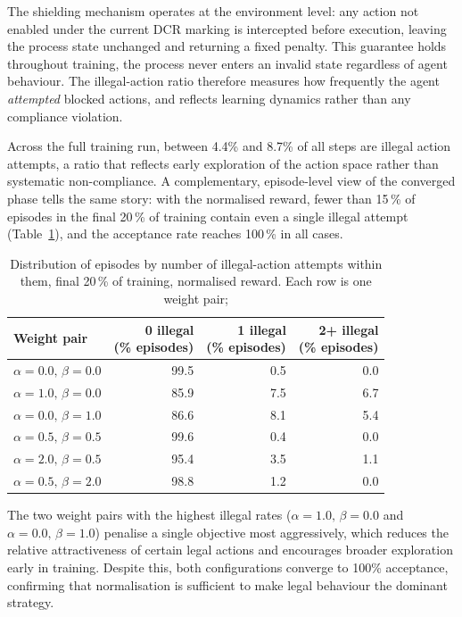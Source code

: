 The shielding mechanism operates at the environment level: any action not enabled under the current \ac{DCR} marking is intercepted before execution, leaving the process state unchanged and returning a fixed
penalty. This guarantee holds throughout training, the process never enters an invalid state regardless of agent behaviour.
The illegal-action ratio therefore measures how frequently the agent \emph{attempted} blocked actions, and reflects learning dynamics rather than any compliance violation.

Across the full training run, between 4.4\% and 8.7\% of all steps
are illegal action attempts, a ratio that reflects early exploration
of the action space rather than systematic non-compliance. A
complementary, episode-level view of the converged phase tells the
same story: with the normalised reward, fewer than 15\,\% of episodes
in the final 20\,\% of training contain even a single illegal
attempt (Table~\ref{tab:illegal_actions}), and the acceptance rate
reaches 100\,\% in all cases.


\begin{table}[H]
\centering
\caption{Distribution of episodes by number of illegal-action attempts within them, final 20\,\% of training, normalised
         reward. Each row is one weight pair;}
\label{tab:illegal_actions}
{\renewcommand{\arraystretch}{1.3}
\setlength{\tabcolsep}{6pt}
\begin{tabular}{lrrr}
\toprule
\textbf{Weight pair} & \shortstack{\textbf{0 illegal}\\\textbf{(\% episodes)}} & \shortstack{\textbf{1 illegal}\\\textbf{(\% episodes)}}
& \shortstack{\textbf{2+ illegal}\\\textbf{(\% episodes)}} \\
\midrule
$\alpha=0.0,\,\beta=0.0$ & 99.5 & 0.5 & 0.0 \\
$\alpha=1.0,\,\beta=0.0$ & 85.9 & 7.5 & 6.7 \\
$\alpha=0.0,\,\beta=1.0$ & 86.6 & 8.1 & 5.4 \\
$\alpha=0.5,\,\beta=0.5$ & 99.6 & 0.4 & 0.0 \\
$\alpha=2.0,\,\beta=0.5$ & 95.4 & 3.5 & 1.1 \\
$\alpha=0.5,\,\beta=2.0$ & 98.8 & 1.2 & 0.0 \\
\bottomrule
\end{tabular}}
\end{table}


The two weight pairs with the highest illegal rates
($\alpha=1.0,\,\beta=0.0$ and $\alpha=0.0,\,\beta=1.0$) penalise a
single objective most aggressively, which reduces the relative
attractiveness of certain legal actions and encourages broader
exploration early in training.
Despite this, both configurations converge to 100\% acceptance,
confirming that normalisation is sufficient to make legal behaviour
the dominant strategy.

